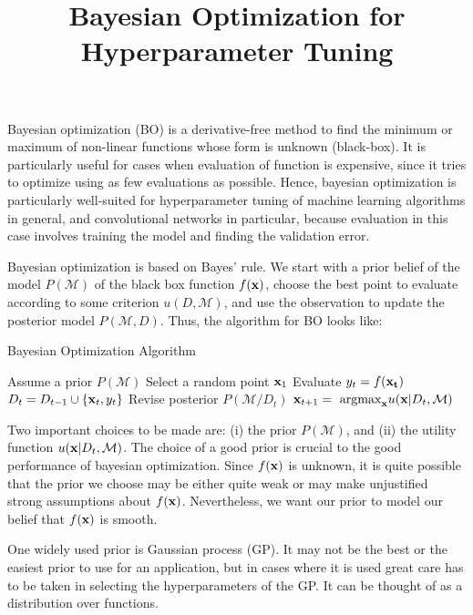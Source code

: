 \documentclass{article}
\title{Bayesian Optimization for Hyperparameter Tuning}
\begin{document}
\maketitle
Bayesian optimization (BO) is a derivative-free method to find the minimum or maximum of non-linear functions whose form is unknown (black-box). It is particularly useful for cases when evaluation of function is expensive, since it tries to optimize using as few evaluations as possible. Hence, bayesian optimization is particularly well-suited for hyperparameter tuning of machine learning algorithms in general, and convolutional networks in particular, because evaluation in this case involves training the model and finding the validation error.

Bayesian optimization is based on Bayes' rule. We start with a prior belief of the model $P(\mathcal M)$ of the black box function $f({\bf x})$, choose the best point to evaluate according to some criterion $u(D, {\mathcal M})$, and use the observation to update the posterior model $P({\mathcal M}, D)$. Thus, the algorithm for BO looks like:

\begin{algorithm}
\caption{Bayesian Optimization Algorithm}\label{bo_algo}
\begin{algorithmic}
\STATE Assume a prior $P({\mathcal M})$
\STATE Select a random point ${\bf x}_1$
\STATE Evaluate $y_t = f({\bf x_t})$
\STATE $D_t = D_{t - 1} \cup \{{\bf x}_t, y_t\}$
\STATE Revise posterior $P({\mathcal M}/D_t)$
\STATE ${\bf x}_{t + 1} = \textrm{ argmax}_{\bf x} u({\bf x} | D_t, {\mathcal M})$ 
\ENDFOR
\end{algorithmic}
\end{algorithm}

Two important choices to be made are: (i) the prior $P(\mathcal M)$, and (ii) the utility function $u({\bf x} | D_t, {\mathcal M})$. The choice of a good prior is crucial to the good performance of bayesian optimization. Since $f({\bf x})$ is unknown, it is quite possible that the prior we choose may be either quite weak or may make unjustified strong assumptions about $f({\bf x})$. Nevertheless, we want our prior to model our belief that $f({\bf x})$ is smooth.

One widely used prior is Gaussian process (GP). It may not be the best or the easiest prior to use for an application, but in cases where it is used great care has to be taken in selecting the hyperparameters of the GP. It can be thought of as a distribution over functions.
\end{document}
